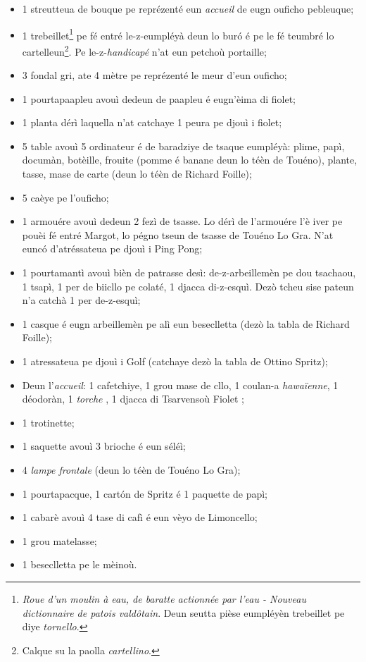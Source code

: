 \Scenographie
\begin{itemize}
\item[$\bullet$] 1 streutteua de bouque pe reprézenté eun \textit{accueil} de eugn ouficho pebleuque;
\item[$\bullet$] 1 trebeillet\footnote{ \textit{Roue d'un moulin à eau, de baratte actionnée par l'eau - Nouveau dictionnaire de patois vald\^otain}. Deun seutta pièse eumpléyèn trebeillet pe diye \textit{tornello}.} pe fé entré le-z-eumpléyà deun lo bur\'o é pe le fé teumbré lo cartelleun\footnote{ Calque su la paolla \textit{cartellino}.}. Pe le-z-\textit{handicapé} n'at eun petchoù portaille;
\item[$\bullet$] 3 fondal gri, ate 4 mètre pe reprézenté le meur d'eun ouficho;
\item[$\bullet$] 1 pourtapaapleu avouì dedeun de paapleu é eugn'èima di fiolet;
\item[$\bullet$] 1 planta dérì laquella n'at catchaye 1 peura pe djouì i fiolet;
\item[$\bullet$] 5 table avouì 5 ordinateur é de baradziye de tsaque eumpléyà: plime, papì, documàn, botèille, frouite (pomme é banane deun lo téèn de Touéno), plante, tasse, mase de carte (deun lo téèn de Richard Foille);
\item[$\bullet$] 5 caèye pe l'ouficho;
\item[$\bullet$] 1 armouére avouì dedeun 2 fezì de tsasse. Lo dérì de l'armouére l'è iver pe pouèi fé entré Margot, lo pégno tseun de tsasse de Touéno Lo Gra. N'at eunc\'o d'atréssateua pe djouì i Ping Pong;
\item[$\bullet$] 1 pourtamantì avouì bièn de patrasse desì: de-z-arbeillemèn pe dou tsachaou, 1 tsapì, 1 per de biicllo pe colaté, 1 djacca di-z-esquì.  Dezò tcheu sise pateun n'a catchà 1 per de-z-esquì;
\item[$\bullet$] 1 casque é eugn arbeillemèn pe alì eun beseclletta (dezò la tabla de Richard Foille);
\item[$\bullet$] 1 atressateua pe djouì i Golf (catchaye dezò la tabla de Ottino Spritz);
\item[$\bullet$] Deun l'\textit{accueil}: 1 cafetchiye, 1 grou mase de cllo, 1 coulan-a \textit{hawaïenne}, 1 déodoràn, 1 \textit{torche} \torcia, 1 djacca di Tsarvensoù Fiolet ;
\item[$\bullet$] 1 trotinette;
\item[$\bullet$] 1 saquette avouì 3 brioche é eun séléì;
\item[$\bullet$] 4 \textit{lampe frontale} (deun lo téèn de Touéno Lo Gra);
\item[$\bullet$] 1 pourtapacque, 1 cart\'on de Spritz é 1 paquette de papì;
\item[$\bullet$] 1 cabarè avouì 4 tase di cafì é eun vèyo de Limoncello;
\item[$\bullet$] 1 grou matelasse;
\item[$\bullet$] 1 beseclletta pe le mèinoù.
\end{itemize}

